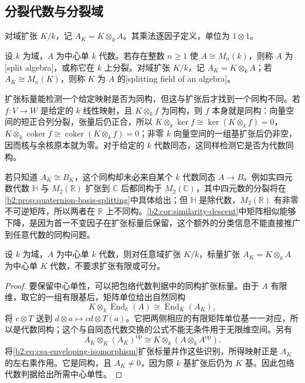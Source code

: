 \subsection{分裂代数与分裂域}
\label{b2:subsec:1701:02}

对域扩张 \(K/k\)，记 \(A_K=K\otimes_kA\)。其乘法逐因子定义，单位为 \(1\otimes1\)。
\begin{definition}\label{b2:def:csa-splitting-field}
	设 \(k\) 为域，\(A\) 为中心单 \(k\) 代数。若存在整数 \(n\geq1\) 使 \(A\cong M_n(k)\)，则称 \(A\) 为[split algebra]，或称它在 \(k\) 上分裂。对域扩张 \(K/k\)，记 \(A_K=K\otimes_kA\)；若 \(A_K\cong M_n(K)\)，则称 \(K\) 为 \(A\) 的[splitting field of an algebra]。
\end{definition}

扩张标量能检测一个给定映射是否为同构，但这与扩张后才找到一个同构不同。若 \(f:V\to W\) 是给定的 \(k\) 线性映射，且 \(K\otimes_k f\) 为同构，则 \(f\) 本身就是同构：向量空间的短正合列分裂，张量后仍正合，所以 \(K\otimes_k\ker f\cong\ker(K\otimes_k f)=0\)，\(K\otimes_k\operatorname{coker}f\cong\operatorname{coker}(K\otimes_k f)=0\)；非零 \(k\) 向量空间的一组基扩张后仍非空，因而核与余核原本就为零。对于给定的 \(k\) 代数同态，这同样检测它是否为代数同构。

\ProseParagraphBreak
若只知道 \(A_K\cong B_K\)，这个同构却未必来自某个 \(k\) 代数同态 \(A\to B\)。例如实四元数代数 \(\mathbb H\) 与 \(M_2(\mathbb R)\) 扩张到 \(\mathbb C\) 后都同构于 \(M_2(\mathbb C)\)，其中四元数的分裂将在\cref{b2:prop:quaternion-basis-splitting}中具体给出；但 \(\mathbb H\) 是除代数，\(M_2(\mathbb R)\) 有非零不可逆矩阵，所以两者在 \(\mathbb R\) 上不同构。\cref{b2:cor:similarity-descent}中矩阵相似能够下降，是因为首一不变因子在扩张标量后保留，这个额外的分类信息不能直接推广到任意代数的同构问题。

\begin{theorem}[标量扩张]\label{b2:thm:csa-base-change}
	设 \(k\) 为域，\(A\) 为中心单 \(k\) 代数，则对任意域扩张 \(K/k\)，标量扩张 \(A_K=K\otimes_kA\) 为中心单 \(K\) 代数，不要求扩张有限或可分。
\end{theorem}
\begin{proof}
	要保留中心单性，可以把包络代数判据中的同构扩张标量。由于 \(A\) 有限维，取它的一组有限基后，矩阵单位给出自然同构
	\[
		K\otimes_k\operatorname{End}_k(A)\cong\operatorname{End}_K(A_K),
	\]
	将 \(c\otimes T\) 送到 \(d\otimes a\mapsto cd\otimes T(a)\)。它把两侧相应的有限矩阵单位基一一对应，所以是代数同构；这个与自同态代数交换的公式不能无条件用于无限维空间。另有
	\[
		A_K\otimes_K(A_K)^{\mathrm{op}} \cong K\otimes_k(A\otimes_kA^{\mathrm{op}}).
	\]
	将\eqref{b2:eq:csa-enveloping-isomorphism}扩张标量并作这些识别，所得映射正是 \(A_K\) 的左右乘作用。它是同构，且 \(A_K\ne0\)，因为原 \(k\) 基扩张后仍为 \(K\) 基。因此包络代数判据给出所需中心单性。
\end{proof}

